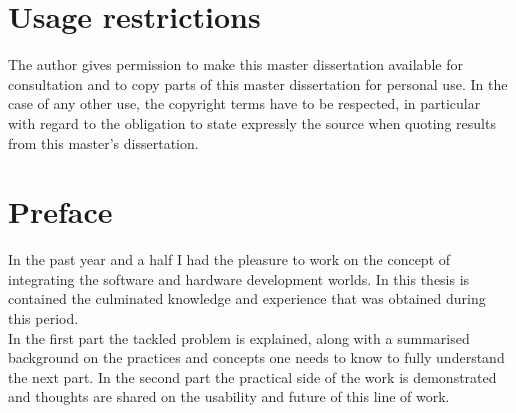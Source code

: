 \documentclass[11pt,british]{article}
\begin{document}

\newpage{}
\part*{Usage restrictions}

The author gives permission to make this master dissertation available for consultation 
and to copy parts of this master dissertation for personal use. 
 In the case of any other use, the copyright terms have to be respected, in particular with regard to 
the obligation to state expressly the source when quoting results from this master's dissertation.

\pagebreak{}


\newpage{}\part*{Preface}
In the past year and a half I had the pleasure to work on the concept of integrating the software and hardware development worlds. In this thesis is contained the culminated knowledge and experience that was obtained during this period.
\\[\baselineskip]
In the first part the tackled problem is explained, along with a summarised background on the practices and concepts one needs to know to fully understand the next part. In the second part the practical side of the work is demonstrated and thoughts are shared on the usability and future of this line of work.
\\[\baselineskip]
\end{document}

